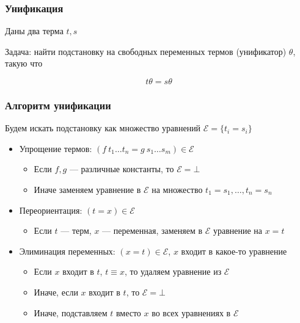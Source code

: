 \documentclass{beamer}
\begin{document}
\begin{frame}[fragile]
  \frametitle{Унификация}

\begin{center}
  Даны два терма $t, s$
\end{center}

\begin{center}
  Задача: найти подстановку на свободных переменных термов (унификатор) $\theta$, такую что
\end{center}

\[
  t \theta = s \theta
\]

\end{frame}

\begin{frame}[fragile]
  \frametitle{Алгоритм унификации}

\begin{center}
  Будем искать подстановку как множество уравнений $\mathcal{E} = \{ t_i = s_i \}$
\end{center}

\begin{itemize}
  \item Упрощение термов: $(f \ t_1 \dots t_n = g \ s_1 \dots s_m) \in \mathcal{E}$
  \begin{itemize}
    \item Если $f, g$ --- различные константы, то $\mathcal{E} = \bot$
    \item Иначе заменяем уравнение в $\mathcal{E}$ на множество $t_1 = s_1, \dots, t_n = s_n$
  \end{itemize}
  \item Переориентация: $(t = x) \in \mathcal{E}$
  \begin{itemize}
    \item Если $t$ --- терм, $x$ --- переменная, заменяем в $\mathcal{E}$ уравнение на $x = t$
  \end{itemize}
  \item Элиминация переменных: $(x = t) \in \mathcal{E}$, $x$ входит в какое-то уравнение
  \begin{itemize}
    \item Если $x$ входит в $t$, $t \equiv x$, то удаляем уравнение из $\mathcal{E}$
    \item Иначе, если $x$ входит в $t$, то $\mathcal{E} = \bot$
    \item Иначе, подставляем $t$ вместо $x$ во всех уравнениях в $\mathcal{E}$
  \end{itemize}
\end{itemize}

\end{frame}
\end{document}
